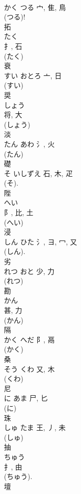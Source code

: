\documentclass[8pt]{extreport}
\begin{document}
\begin{CJK}{UTF8}{min}
\\	かく	つる	宀, 隹, 鳥	
\\	(つる)!
\\	拓	
\\	たく	
\\	扌, 石	
\\	(たく) 
\\	衰	
\\	すい	おとろ	亠, 日		
\\	(すい) 
\\	奨	
\\	しょう	
\\	将, 大	
\\	(しょう) 
\\	淡	
\\	たん	あわ	氵, 火	
\\	(たん) 
\\	礎	
\\	そ	いしずえ	石, 木, 疋	
\\	(そ).	
\\	陛	
\\	へい	
\\	阝, 比, 土	
\\	(へい) 
\\	浸	
\\	しん	ひた	氵, ヨ, 冖, 又	
\\	(しん). 
\\	劣	
\\	れつ	おと	少, 力	
\\	(れつ) 
\\	勘	
\\	かん	
\\	甚, 力	
\\	(かん) 
\\	隔	
\\	かく	へだ	阝, 鬲	
\\	(かく) 
\\	桑	
\\	そう	くわ	又, 木	
\\	(くわ) 
\\	尼	
\\	に	あま	尸, 匕	
\\	(に) 
\\	珠	
\\	しゅ	たま	王, 丿, 未	
\\	(しゅ) 
\\	抽	
\\	ちゅう	
\\	扌, 由	
\\	(ちゅう). 
\\	壇	

\end{CJK}
\end{document}
